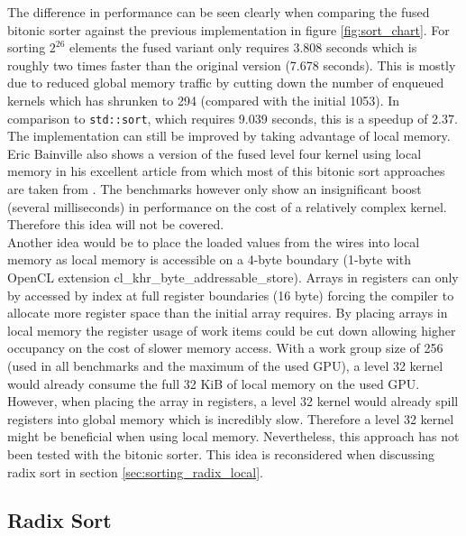 The difference in performance can be seen clearly when comparing the fused bitonic sorter against the previous implementation in figure \ref{fig:sort_chart}. For sorting $2^{26}$ elements the fused variant only requires 3.808 seconds which is roughly two times faster than the original version (7.678 seconds). This is mostly due to reduced global memory traffic by cutting down the number of enqueued kernels which has shrunken to 294 (compared with the initial 1053). In comparison to \lstinline!std::sort!, which requires 9.039 seconds, this is a speedup of 2.37. \\
The implementation can still be improved by taking advantage of local memory. Eric Bainville also shows a version of the fused level four kernel using local memory in his excellent article from which most of this bitonic sort approaches are taken from \cite{sort_bealto}. The benchmarks however only show an insignificant boost (several milliseconds) in performance on the cost of a relatively complex kernel. Therefore this idea will not be covered. \\
Another idea would be to place the loaded values from the wires into local memory as local memory is accessible on a 4-byte boundary (1-byte with OpenCL extension cl\_khr\_byte\_addressable\_store). Arrays in registers can only by accessed by index at full register boundaries (16 byte) forcing the compiler to allocate more register space than the initial array requires. By placing arrays in local memory the register usage of work items could be cut down allowing higher occupancy on the cost of slower memory access. With a work group size of 256 (used in all benchmarks and the maximum of the used GPU), a level 32 kernel would already consume the full 32 KiB of local memory on the used GPU. However, when placing the array in registers, a level 32 kernel would already spill registers into global memory which is incredibly slow. Therefore a level 32 kernel might be beneficial when using local memory. Nevertheless, this approach has not been tested with the bitonic sorter. This idea is reconsidered when discussing radix sort in section \ref{sec:sorting_radix_local}.


\subsection{Radix Sort}
\label{sec:sorting_radix}

